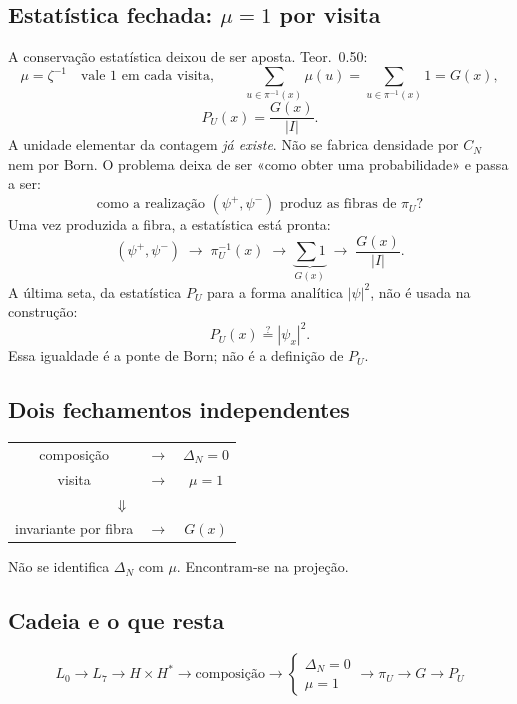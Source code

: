 \documentclass[11pt,a4paper]{article}
\begin{document}
\subsection{Estatística fechada: $\mu=1$ por visita}

A conservação estatística deixou de ser aposta. Teor.~0.50:
\[
\mu=\zeta^{-1}\quad\text{vale 1 em cada visita},\qquad
\sum_{u\in\pi^{-1}(x)}\mu(u)=\sum_{u\in\pi^{-1}(x)}1=G(x),
\]
\[
\boxed{P_U(x)=\frac{G(x)}{|I|}}.
\]
A unidade elementar da contagem \emph{já existe}. Não se fabrica densidade por $C_N$
nem por Born. O problema deixa de ser «como obter uma probabilidade» e passa a ser:
\[
\boxed{\text{como a realização }(\psi^+,\psi^-)\text{ produz as fibras de }\pi_U?}
\]
Uma vez produzida a fibra, a estatística está pronta:
\[
(\psi^+,\psi^-)\;\longrightarrow\;\pi_U^{-1}(x)\;\longrightarrow\;
\underbrace{\sum 1}_{G(x)}\;\longrightarrow\;\frac{G(x)}{|I|}.
\]
A última seta, da estatística $P_U$ para a forma analítica $|\psi|^2$, não é usada na construção:
\[
\boxed{P_U(x)\stackrel{?}{=}|\psi_x|^2.}
\]
Essa igualdade é a ponte de Born; não é a definição de $P_U$.

\subsection{Dois fechamentos independentes}

\begin{center}
\renewcommand{\arraystretch}{1.3}
\begin{tabular}{@{}ccc@{}}
composição & $\longrightarrow$ & $\Delta_N=0$ \\
visita & $\longrightarrow$ & $\mu=1$ \\
\multicolumn{3}{c}{$\Downarrow$} \\
invariante por fibra & $\longrightarrow$ & $G(x)$ \\
\end{tabular}
\end{center}

Não se identifica $\Delta_N$ com $\mu$. Encontram-se na projeção.

\subsection{Cadeia e o que resta}

\[
\boxed{
L_0\to L_7\to H\times H^*\to\text{composição}
\to
\begin{cases}\Delta_N=0\\ \mu=1\end{cases}
\to\pi_U\to G\to P_U
}
\]
\end{document}
